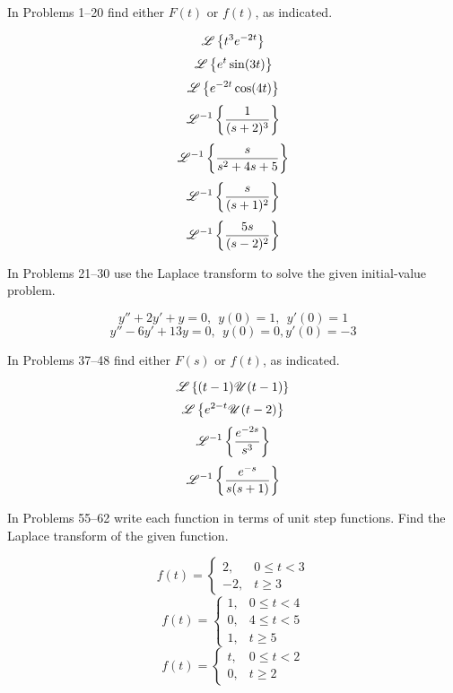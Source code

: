 \documentclass[chapter=7,section=3]{math252homework}
\begin{document}
In Problems 1--20 find either $F(t)$ or $f(t)$, as indicated.
\begin{problems}[start=3]
	\problem \[ \mathscr{L}\left\{ t^{3}e^{-2t} \right\} \]							%
	\setcounter{problemsi}{6}
	\problem \[ \mathscr{L}\left\{ e^{t}\sin(3t) \right\} \]								%
	\problem \[ \mathscr{L}\left\{ e^{-2t}\cos(4t) \right\} \]							%
	\setcounter{problemsi}{10}
	\problem \[ \mathscr{L}^{-1}\left\{ \frac{1}{(s+2)^{3}} \right\} \]					%
	\setcounter{problemsi}{14}
	\problem \[ \mathscr{L}^{-1}\left\{ \frac{s}{s^{2} + 4s + 5} \right\} \]				%
	\setcounter{problemsi}{16}
	\problem \[ \mathscr{L}^{-1}\left\{ \frac{s}{(s+1)^{2}} \right\} \]					%
	\problem \[ \mathscr{L}^{-1}\left\{ \frac{5s}{(s-2)^{2}} \right\} \]				%
\end{problems}

In Problems 21--30 use the Laplace transform to solve the given initial-value problem.
\begin{problems}[start=23]
	\problem \[ y'' + 2y' + y = 0,\ \ y(0)=1,\ \ y'(0)=1 \]			%
	\setcounter{problemsi}{26}
	\problem \[ y'' - 6y' + 13y = 0,\ \ y(0)=0, y'(0)=-3 \]			%
\end{problems}

In Problems 37--48 find either $F(s)$ or $f(t)$, as indicated.
\begin{problems}[start=37]
	\problem \[ \mathscr{L}\left\{ (t-1)\mathscr{U}(t-1) \right\} \] 			%
	\problem \[ \mathscr{L}\left\{ e^{2-t}\mathscr{U}(t-2) \right\} \]			%
	\setcounter{problemsi}{42}
	\problem \[ \mathscr{L}^{-1}\left\{ \frac{e^{-2s}}{s^{3}} \right\} \]			%
	\setcounter{problemsi}{46}
	\problem \[ \mathscr{L}^{-1}\left\{ \frac{e^{-s}}{s(s+1)} \right\} \]			%
\end{problems}

In Problems 55--62 write each function in terms of unit step functions.
Find the Laplace transform of the given function.
\begin{problems}[start=55]
	\problem \[ f(t) = \left\{ \begin{array}{lr}
		2, & 0 \leq t < 3 \\
		-2, & t \geq 3
	\end{array} \right. \]			%
	\problem \[ f(t) = \left\{ \begin{array}{lr}
		1, & 0 \leq t < 4 \\
		0, & 4 \leq t < 5 \\
		1, & t \geq 5
	\end{array} \right. \]			%
	\setcounter{problemsi}{58}
	\problem \[ f(t) = \left\{ \begin{array}{lr}
		t, & 0 \leq t < 2 \\
		0, & t \geq 2
	\end{array} \right. \]			%
\end{problems}
\end{document}
